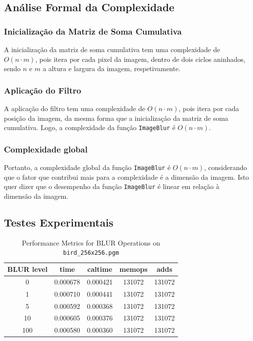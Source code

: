 \documentclass{report}
\begin{document}
\subsection{Análise Formal da Complexidade}

\subsubsection{Inicialização da Matriz de Soma Cumulativa}
A inicialização da matriz de soma cumulativa tem uma complexidade de \(O(n \cdot m)\), pois itera por cada pixel da imagem,
dentro de dois ciclos aninhados, sendo \(n\) e \(m\) a altura e largura da imagem, respetivamente.

\subsubsection{Aplicação do Filtro}
A aplicação do filtro tem uma complexidade de \(O(n \cdot m)\), pois itera por cada posição da imagem, da mesma forma que a inicialização 
da matriz de soma cumulativa. Logo, a complexidade da função \texttt{ImageBlur} é \(O(n \cdot m)\).
\par

\subsubsection{Complexidade global}
Portanto, a complexidade global da função \texttt{ImageBlur} é \(O(n \cdot m)\), considerando que o fator que contribui mais para a complexidade 
é a dimensão da imagem. Isto quer dizer que o desempenho da função \texttt{ImageBlur} é linear em relação à dimensão da imagem.



\subsection{Testes Experimentais}

\begin{table}[h]
    \centering
    \begin{tabular}{ccccc}
        \toprule
        \textbf{BLUR level} & \textbf{time} & \textbf{caltime} & \textbf{memops} & \textbf{adds} \\
        \midrule
        0 & 0.000678 & 0.000421 & 131072 & 131072 \\
        1 & 0.000710 & 0.000441 & 131072 & 131072 \\
        5 & 0.000592 & 0.000368 & 131072 & 131072 \\
        10 & 0.000605 & 0.000376 & 131072 & 131072 \\
        100 & 0.000580 & 0.000360 & 131072 & 131072 \\
        \bottomrule
    \end{tabular}
    \caption*{Performance Metrics for BLUR Operations on \texttt{bird\_256x256.pgm}}
\end{table}
\end{document}

